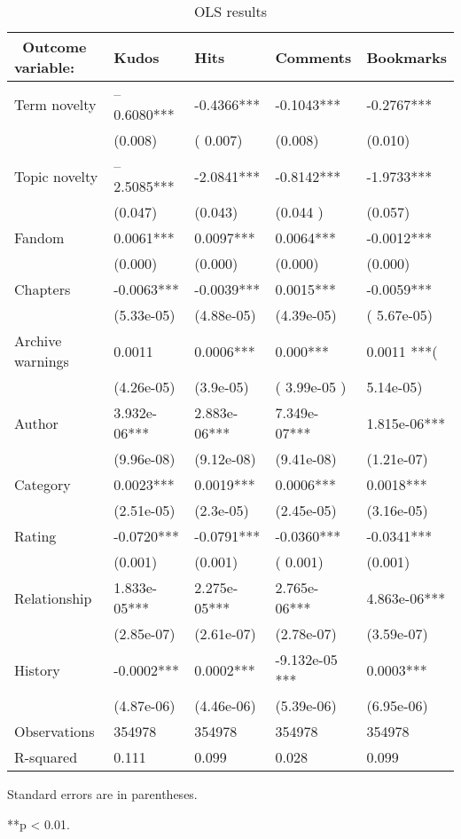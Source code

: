 \documentclass[a4paper]{article}
\begin{document}
 \begin{table}
\centering
\begin{tabular}[width=0.8\textwidth]{p{3cm}p{3cm}p{3cm}p{3cm}p{3cm}}
\toprule
\ Outcome variable: & Kudos & Hits & Comments & Bookmarks \\ 
   \hline			
Term novelty & --0.6080***&  -0.4366***  & -0.1043*** & -0.2767*** \\
& (0.008) & ( 0.007) & (0.008) & (0.010)\\
Topic novelty & --2.5085*** & -2.0841*** & -0.8142*** & -1.9733*** \\
& (0.047) & (0.043) &  (0.044 ) & (0.057)\\
Fandom & 0.0061*** & 0.0097*** & 0.0064*** & -0.0012*** \\
& (0.000) & (0.000) & (0.000) & (0.000)\\
Chapters & -0.0063***& -0.0039*** & 0.0015***& -0.0059*** \\
& (5.33e-05) & (4.88e-05) & (4.39e-05) & ( 5.67e-05) \\
Archive warnings & 0.0011 & 0.0006*** & 0.000***& 0.0011 ***(\\
& (4.26e-05) & (3.9e-05) & ( 3.99e-05 ) & 5.14e-05)\\
Author & 3.932e-06*** & 2.883e-06***& 7.349e-07*** & 1.815e-06***\\
& (9.96e-08) & (9.12e-08) & (9.41e-08) & (1.21e-07)\\
Category & 0.0023***& 0.0019***& 0.0006*** & 0.0018***\\
& (2.51e-05)  & (2.3e-05)  & (2.45e-05) & (3.16e-05)\\ 
Rating & -0.0720*** & -0.0791***& -0.0360*** & -0.0341***\\
& (0.001) & (0.001) & ( 0.001) & (0.001) \\
Relationship & 1.833e-05*** & 2.275e-05***&  2.765e-06*** & 4.863e-06***\\
& (2.85e-07) & (2.61e-07) & (2.78e-07) & (3.59e-07) \\
History & -0.0002***& 0.0002*** & -9.132e-05 ***& 0.0003***\\
& (4.87e-06) & (4.46e-06) & (5.39e-06) & (6.95e-06)\\
\hline 
Observations & 354978 & 354978 & 354978 & 354978 \\
R-squared & 0.111 & 0.099 & 0.028 & 0.099\\
\bottomrule
\end{tabular}
 \begin{tablenotes}
      \small
      \item Standard errors are in parentheses.
      \item ***p < 0.01.
       \end{tablenotes}
\caption{OLS results}
\label{tab:regression}
\end{table}%
\end{document}
